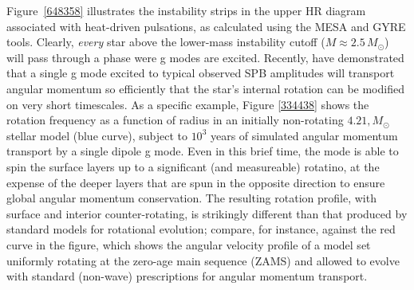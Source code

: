 Figure~\ref{648358} illustrates the instability strips in the upper HR diagram associated with heat-driven pulsations, as calculated using the MESA and GYRE tools. Clearly, \emph{every} star above the lower-mass instability cutoff ($M \approx 2.5\,M_{\odot}$) will pass through a phase were g modes are excited. Recently, \citet{Townsend:2017} have demonstrated that a single g mode excited to typical observed SPB amplitudes will transport angular momentum so efficiently that the star's internal rotation can be modified on very short timescales. As a specific example, Figure \ref{334438} shows the rotation frequency as a function of radius in an initially non-rotating $4.21,M_{\odot}$ stellar model (blue curve), subject to $10^3$ years of simulated angular momentum transport by a single dipole g mode. Even in this brief time, the mode is able to spin the surface layers up to a significant (and measureable) rotatino, at the expense of the deeper layers that are spun in the opposite direction to ensure global angular momentum conservation. The resulting rotation profile, with surface and interior counter-rotating, is strikingly different than that produced by standard models for rotational evolution; compare, for instance, against the red curve in the figure, which shows the angular velocity profile of a model set uniformly rotating at the zero-age main sequence (ZAMS) and allowed to evolve with standard (non-wave) prescriptions for angular momentum transport.


